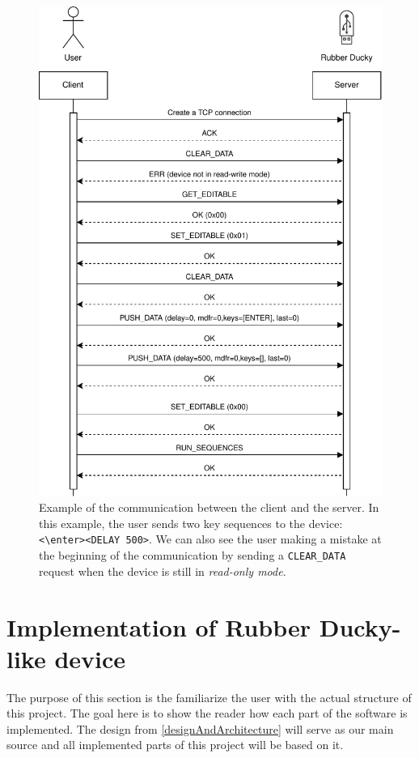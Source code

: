 \begin{figure}
    \centering
    \includegraphics{obrazky-figures/dataflow.pdf}
    \caption{Example of the communication between the client and the server. In this example, the user sends two key sequences to the device: \texttt{<\textbackslash{}enter><DELAY 500>}. We can also see the user making a mistake at the beginning of the communication by sending a \texttt{CLEAR\_DATA} request when the device is still in \emph{read-only mode}.}
    \label{fig:dataflow_example}
\end{figure}

\chapter{Implementation of Rubber Ducky-like device}
\label{implementation}
The purpose of this section is the familiarize the user with the actual structure of this project. The goal here is to show the reader how each part of the software is implemented. The design from \autoref{designAndArchitecture} will serve as our main source and all implemented parts of this project will be based on it.

